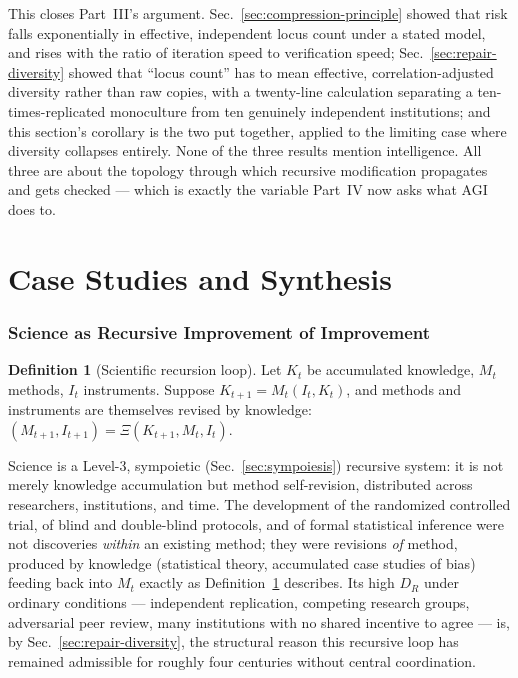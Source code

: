 \documentclass[12pt,a4paper]{article}
\theoremstyle{plain}
\theoremstyle{definition}
\newtheorem{definition}[theorem]{Definition}
\theoremstyle{remark}
\newcommand{\DR}{D_R}
\begin{document}
This closes Part~III's argument. Sec.~\ref{sec:compression-principle} showed that risk falls exponentially in effective, independent locus count under a stated model, and rises with the ratio of iteration speed to verification speed; Sec.~\ref{sec:repair-diversity} showed that ``locus count'' has to mean effective, correlation-adjusted diversity rather than raw copies, with a twenty-line calculation separating a ten-times-replicated monoculture from ten genuinely independent institutions; and this section's corollary is the two put together, applied to the limiting case where diversity collapses entirely. None of the three results mention intelligence. All three are about the topology through which recursive modification propagates and gets checked — which is exactly the variable Part~IV now asks what AGI does to.

\part{Case Studies and Synthesis}

\section{Science as Recursive Improvement of Improvement}
\label{sec:science}

\begin{definition}[Scientific recursion loop]
\label{def:science-loop}
Let $K_t$ be accumulated knowledge, $M_t$ methods, $I_t$ instruments. Suppose $K_{t+1} = M_t(I_t, K_t)$, and methods and instruments are themselves revised by knowledge: $(M_{t+1}, I_{t+1}) = \Xi(K_{t+1}, M_t, I_t)$.
\end{definition}

Science is a Level-3, sympoietic (Sec.~\ref{sec:sympoiesis}) recursive system: it is not merely knowledge accumulation but method self-revision, distributed across researchers, institutions, and time. The development of the randomized controlled trial, of blind and double-blind protocols, and of formal statistical inference were not discoveries \emph{within} an existing method; they were revisions \emph{of} method, produced by knowledge (statistical theory, accumulated case studies of bias) feeding back into $M_t$ exactly as Definition~\ref{def:science-loop} describes. Its high $\DR$ under ordinary conditions — independent replication, competing research groups, adversarial peer review, many institutions with no shared incentive to agree — is, by Sec.~\ref{sec:repair-diversity}, the structural reason this recursive loop has remained admissible for roughly four centuries without central coordination.
\end{document}
